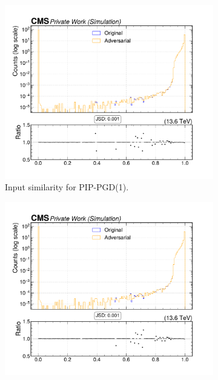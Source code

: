 \begin{figure}[htbp]
  \centering
  \begin{subfigure}[t]{0.32\textwidth}
    \includegraphics[width=\linewidth]{media/output/features/compare/combined_it_1/cmp_cpf_arr_Cpfcan_BtagPf_trackPParRatio.pdf}
    \caption*{Input similarity for PIP-PGD(1).}
  \end{subfigure}\hfill
  \begin{subfigure}[t]{0.32\textwidth}
    \includegraphics[width=\linewidth]{media/output/features/compare/combined_it_2/cmp_cpf_arr_Cpfcan_BtagPf_trackPParRatio.pdf}

\end{subfigure}
\end{figure}
